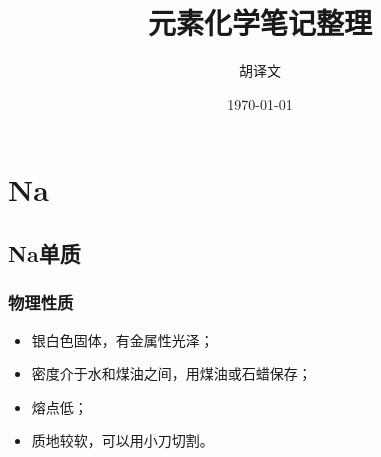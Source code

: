 \documentclass[a4paper]{article}
\title{元素化学笔记整理}
\author{胡译文}
\date{\today}
\renewcommand\contentsname{目录}
\begin{document}
	\maketitle
	\renewcommand\contentsname{目录}
	\tableofcontents
	\newpage
	\section{Na}
	\subsection{Na单质}
	\subsubsection{物理性质}
	\begin{itemize}
		\item 银白色固体，有金属性光泽；
		\item 密度介于水和煤油之间，用煤油或石蜡保存；
		\item 熔点低；
		\item 质地较软，可以用小刀切割。
	\end{itemize}
\end{document}

